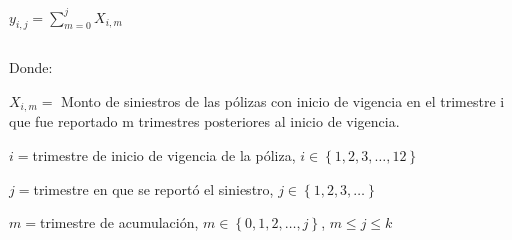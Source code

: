 \documentclass[11pt,twoside,openright,spanish]{report}
\numberwithin{equation}{chapter}
\numberwithin{figure}{chapter}
\numberwithin{table}{chapter}
\begin{document}
	
	
	\doublespacing

$ $

\doublespacing
	

	{\centering
	${y}_{i,j}=\sum _{m=0}^{j}{X}_{i,m}$
	
}
	
	\doublespacing

$ $

\doublespacing
	
		Donde:
		
	\doublespacing
	
	${X}_{i,m}=$ Monto de siniestros de las pólizas con inicio de vigencia en el trimestre i que fue reportado m trimestres posteriores al inicio de vigencia.
	\noindent
	
	$i=$trimestre de inicio de vigencia de la póliza, $i\in \left\{1,2,3,\dots ,12\right\}$
	\noindent
	
	$j=$trimestre en que se reportó el siniestro,  $j\in \left\{1,2,3,\dots\right\}$
	\noindent
	
	$m=$trimestre de acumulación, $m\in \left\{0,1,2,\dots ,j\right\}$, $m\le j\le k$
	\noindent
	
	\doublespacing

$ $

\doublespacing
	
\end{document}
